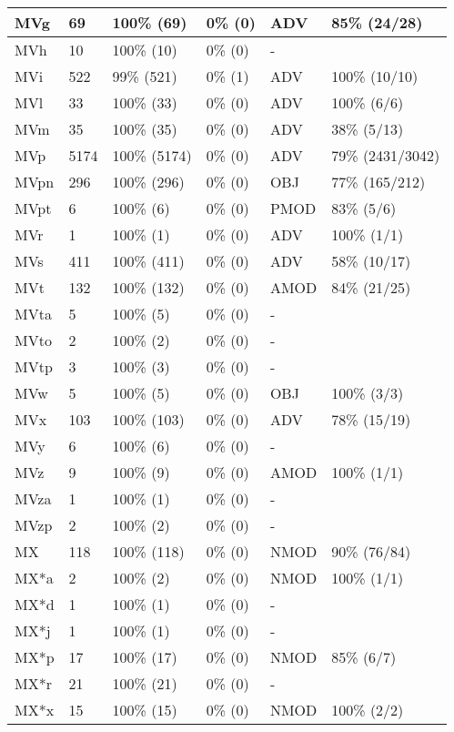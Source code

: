 \begin{figure*}
\begin{tabular}{|l|l|l|l||l|l|}
\hline
 MVg & 69 & 100\% (69) & 0\% (0) & ADV & 85\% (24/28) \\ 
\hline
 MVh & 10 & 100\% (10) & 0\% (0) & - &  \\ 
\hline
 MVi & 522 & 99\% (521) & 0\% (1) & ADV & 100\% (10/10) \\ 
\hline
 MVl & 33 & 100\% (33) & 0\% (0) & ADV & 100\% (6/6) \\ 
\hline
 MVm & 35 & 100\% (35) & 0\% (0) & ADV & 38\% (5/13) \\ 
\hline
 MVp & 5174 & 100\% (5174) & 0\% (0) & ADV & 79\% (2431/3042) \\ 
\hline
 MVpn & 296 & 100\% (296) & 0\% (0) & OBJ & 77\% (165/212) \\ 
\hline
 MVpt & 6 & 100\% (6) & 0\% (0) & PMOD & 83\% (5/6) \\ 
\hline
 MVr & 1 & 100\% (1) & 0\% (0) & ADV & 100\% (1/1) \\ 
\hline
 MVs & 411 & 100\% (411) & 0\% (0) & ADV & 58\% (10/17) \\ 
\hline
 MVt & 132 & 100\% (132) & 0\% (0) & AMOD & 84\% (21/25) \\ 
\hline
 MVta & 5 & 100\% (5) & 0\% (0) & - &  \\ 
\hline
 MVto & 2 & 100\% (2) & 0\% (0) & - &  \\ 
\hline
 MVtp & 3 & 100\% (3) & 0\% (0) & - &  \\ 
\hline
 MVw & 5 & 100\% (5) & 0\% (0) & OBJ & 100\% (3/3) \\ 
\hline
 MVx & 103 & 100\% (103) & 0\% (0) & ADV & 78\% (15/19) \\ 
\hline
 MVy & 6 & 100\% (6) & 0\% (0) & - &  \\ 
\hline
 MVz & 9 & 100\% (9) & 0\% (0) & AMOD & 100\% (1/1) \\ 
\hline
 MVza & 1 & 100\% (1) & 0\% (0) & - &  \\ 
\hline
 MVzp & 2 & 100\% (2) & 0\% (0) & - &  \\ 
\hline
 MX & 118 & 100\% (118) & 0\% (0) & NMOD & 90\% (76/84) \\ 
\hline
 MX*a & 2 & 100\% (2) & 0\% (0) & NMOD & 100\% (1/1) \\ 
\hline
 MX*d & 1 & 100\% (1) & 0\% (0) & - &  \\ 
\hline
 MX*j & 1 & 100\% (1) & 0\% (0) & - &  \\ 
\hline
 MX*p & 17 & 100\% (17) & 0\% (0) & NMOD & 85\% (6/7) \\ 
\hline
 MX*r & 21 & 100\% (21) & 0\% (0) & - &  \\ 
\hline
 MX*x & 15 & 100\% (15) & 0\% (0) & NMOD & 100\% (2/2) \\ 
\hline
\end{tabular}
\end{figure*}
